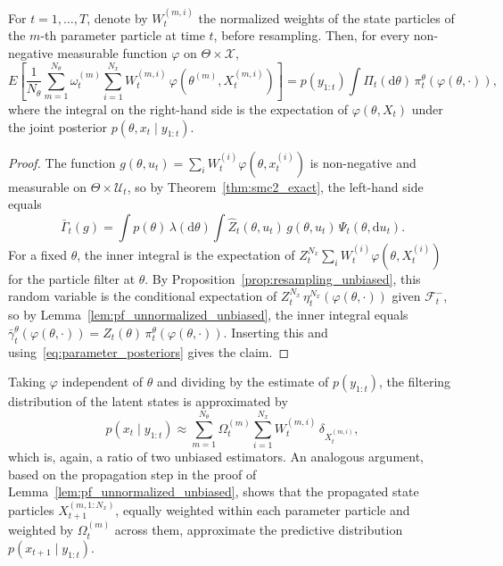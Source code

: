 \begin{proposition}
    \label{prop:smc2_filtering}
    For $t=1,\ldots,T$, denote by $W_t^{(m,i)}$ the normalized weights of the state particles of the $m$-th parameter particle at time $t$, before resampling. Then, for every non-negative measurable function $\varphi$ on $\Theta\times\mathcal{X}$,
    \begin{equation}
        E\left[\frac{1}{N_\theta}\sum_{m=1}^{N_\theta}\omega_t^{(m)}\sum_{i=1}^{N_x}W_t^{(m,i)}\,\varphi(\theta^{(m)},X_t^{(m,i)})\right] = p(y_{1:t})\int\Pi_t(\mathrm{d}\theta)\,\pi_t^\theta\left(\varphi(\theta,\cdot)\right),
    \end{equation}
    where the integral on the right-hand side is the expectation of $\varphi(\theta,X_t)$ under the joint posterior $p(\theta,x_t\mid y_{1:t})$.
\end{proposition}
\begin{proof}
    The function $g(\theta,u_t) = \sum_iW_t^{(i)}\varphi(\theta,x_t^{(i)})$ is non-negative and measurable on $\Theta\times\mathcal{U}_t$, so by Theorem~\ref{thm:smc2_exact}, the left-hand side equals
    \begin{equation}
        \bar{\Gamma}_t(g) = \int p(\theta)\,\lambda(\mathrm{d}\theta)\int\hat{Z}_t(\theta,u_t)\,g(\theta,u_t)\,\Psi_t(\theta,\mathrm{d}u_t).
    \end{equation}
    For a fixed $\theta$, the inner integral is the expectation of $Z_t^{N_x}\sum_iW_t^{(i)}\varphi(\theta,X_t^{(i)})$ for the particle filter at $\theta$. By Proposition~\ref{prop:resampling_unbiased}, this random variable is the conditional expectation of $Z_t^{N_x}\,\eta_t^{N_x}(\varphi(\theta,\cdot))$ given $\mathcal{F}_t^-$, so by Lemma~\ref{lem:pf_unnormalized_unbiased}, the inner integral equals $\bar{\gamma}_t^\theta(\varphi(\theta,\cdot)) = Z_t(\theta)\,\pi_t^\theta(\varphi(\theta,\cdot))$. Inserting this and using~\eqref{eq:parameter_posteriors} gives the claim.
\end{proof}

Taking $\varphi$ independent of $\theta$ and dividing by the estimate of $p(y_{1:t})$, the filtering distribution of the latent states is approximated by
\begin{equation}
    p(x_t\mid y_{1:t})\approx\sum_{m=1}^{N_\theta}\Omega_t^{(m)}\sum_{i=1}^{N_x}W_t^{(m,i)}\,\delta_{X_t^{(m,i)}},
\end{equation}
which is, again, a ratio of two unbiased estimators. An analogous argument, based on the propagation step in the proof of Lemma~\ref{lem:pf_unnormalized_unbiased}, shows that the propagated state particles $X_{t+1}^{(m,1:N_x)}$, equally weighted within each parameter particle and weighted by $\Omega_t^{(m)}$ across them, approximate the predictive distribution $p(x_{t+1}\mid y_{1:t})$.

